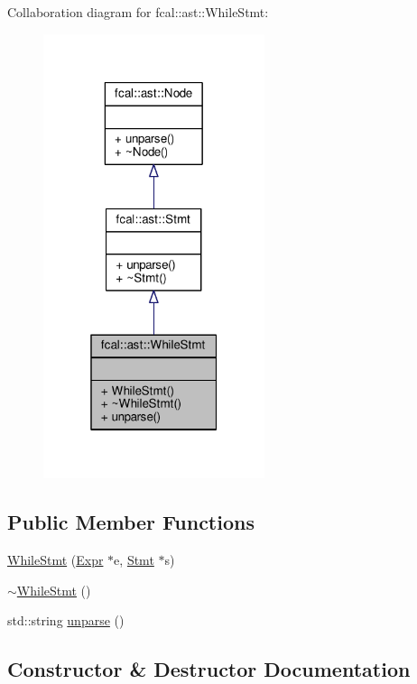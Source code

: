 Collaboration diagram for fcal\+:\+:ast\+:\+:While\+Stmt\+:
\nopagebreak
\begin{figure}[H]
\begin{center}
\leavevmode
\includegraphics[width=184pt]{classfcal_1_1ast_1_1WhileStmt__coll__graph}
\end{center}
\end{figure}
\subsection*{Public Member Functions}
\begin{DoxyCompactItemize}
\item 
\hyperlink{classfcal_1_1ast_1_1WhileStmt_ab17284539316f58894202215dcbabce9}{While\+Stmt} (\hyperlink{classfcal_1_1ast_1_1Expr}{Expr} $\ast$e, \hyperlink{classfcal_1_1ast_1_1Stmt}{Stmt} $\ast$s)
\item 
\hyperlink{classfcal_1_1ast_1_1WhileStmt_a05e98920f6a22ac37bad3319cb088e82}{$\sim$\+While\+Stmt} ()
\item 
std\+::string \hyperlink{classfcal_1_1ast_1_1WhileStmt_af8c98bdb02459b303307a99573b57b07}{unparse} ()
\end{DoxyCompactItemize}


\subsection{Constructor \& Destructor Documentation}
